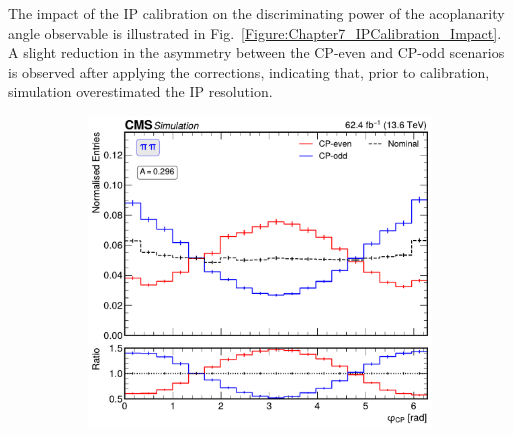 \begin{figure}[!htbp]
    \label{Figure:IPvector_Corrections}
\end{figure}

The impact of the \ac{IP} calibration on the discriminating power of the acoplanarity angle observable is illustrated in Fig.~\ref{Figure:Chapter7_IPCalibration_Impact}. A slight reduction in the asymmetry between the CP-even and CP-odd scenarios is observed after applying the corrections, indicating that, prior to calibration, simulation overestimated the IP resolution.

\begin{figure}[!htbp]
        \centering
        \begin{subfigure}[b]{0.49\textwidth}
            \centering
            \includegraphics[width=\textwidth]{Figures/Chapter7/Acoplanarity/Without_IP/aco_pi_pi.pdf}
            \caption{}
        \end{subfigure}
        \begin{subfigure}[b]{0.49\textwidth}
            \centering

\end{subfigure}
\end{figure}
